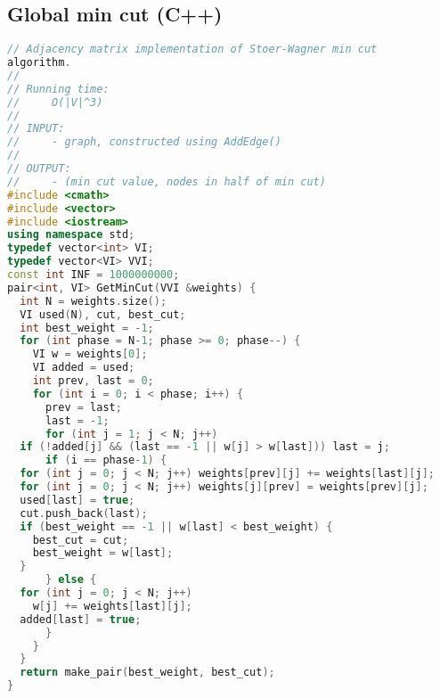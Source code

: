 \subsection{Global min cut (C++)}
\begin{lstlisting}[language=C++]
// Adjacency matrix implementation of Stoer-Wagner min cut 
algorithm.
//
// Running time:
//     O(|V|^3)
//
// INPUT: 
//     - graph, constructed using AddEdge()
//
// OUTPUT:
//     - (min cut value, nodes in half of min cut)
#include <cmath>
#include <vector>
#include <iostream>
using namespace std;
typedef vector<int> VI;
typedef vector<VI> VVI;
const int INF = 1000000000;
pair<int, VI> GetMinCut(VVI &weights) {
  int N = weights.size();
  VI used(N), cut, best_cut;
  int best_weight = -1;
  for (int phase = N-1; phase >= 0; phase--) {
    VI w = weights[0];
    VI added = used;
    int prev, last = 0;
    for (int i = 0; i < phase; i++) {
      prev = last;
      last = -1;
      for (int j = 1; j < N; j++)
  if (!added[j] && (last == -1 || w[j] > w[last])) last = j;
      if (i == phase-1) {
  for (int j = 0; j < N; j++) weights[prev][j] += weights[last][j];
  for (int j = 0; j < N; j++) weights[j][prev] = weights[prev][j];
  used[last] = true;
  cut.push_back(last);
  if (best_weight == -1 || w[last] < best_weight) {
    best_cut = cut;
    best_weight = w[last];
  }
      } else {
  for (int j = 0; j < N; j++)
    w[j] += weights[last][j];
  added[last] = true;
      }
    }
  }
  return make_pair(best_weight, best_cut);
}
\end{lstlisting}
